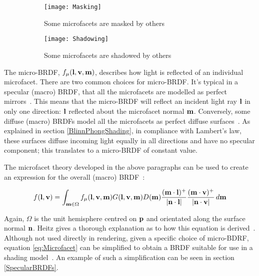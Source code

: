 \begin{figure}[h]
	\begin{subfigure}{0.48\textwidth}
		\texttt{[image: Masking]}
		\caption{Some microfacets are masked by others}
	\end{subfigure}
	\hspace*{\fill}
	\begin{subfigure}{0.48\textwidth}
		\texttt{[image: Shadowing]}
		\caption{Some microfacets are shadowed by others}
	\end{subfigure}
	\caption{}
	\label{fig:MaskingAndShadowing}
\end{figure}

The micro-BRDF, \begin{math}f_\mu(\mathbf{l}, \mathbf{v}, \mathbf{m})\end{math}, describes how light is reflected of an individual microfacet. There are two common choices for micro-BRDF. It's typical in a specular (macro) BRDF, that all the microfacets are modelled as perfect mirrors~\cite{CookTorrance}. This means that the micro-BRDF will reflect an incident light ray \begin{math}\mathbf{l}\end{math} in only one direction: \begin{math}\mathbf{l}\end{math} reflected about the microfacet normal \begin{math}\mathbf{m}\end{math}. Conversely, some diffuse (macro) BRDFs model all the microfacets as perfect diffuse surfaces~\cite{OrenAndNayar}. As explained in section \ref{BlinnPhongShading}, in compliance with Lambert's law, these surfaces diffuse incoming light equally in all directions and have no specular component; this translates to a micro-BRDF of constant value.

The microfacet theory developed in the above paragraphs can be used to create an expression for the overall (macro) BRDF~\cite{RTR4}:

\begin{equation} \label{eq:Microfacet}
	f(\mathbf{l}, \mathbf{v}) = \int_{\mathbf{m}\in\Omega}f_\mu(\mathbf{l}, \mathbf{v}, \mathbf{m})G(\mathbf{l}, \mathbf{v}, \mathbf{m})D(\mathbf{m})\frac{(\mathbf{m}\cdot\mathbf{l})^+}{\abs{\mathbf{n}\cdot\mathbf{l}}}\frac{(\mathbf{m}\cdot\mathbf{v})^+}{\abs{\mathbf{n}\cdot\mathbf{v}}}\,d\mathbf{m}
\end{equation}

Again, \begin{math}\Omega\end{math} is the unit hemisphere centred on \begin{math}\mathbf{p}\end{math} and orientated along the surface normal \begin{math}\mathbf{n}\end{math}. Heitz gives a thorough explanation as to how this equation is derived~\cite{HeitzMicrofacetTheory}. Although not used directly in rendering, given a specific choice of micro-BDRF, equation \ref{eq:Microfacet} can be simplified to obtain a BRDF suitable for use in a shading model~\cite{RTR4}. An example of such a simplification can be seen in section \ref{SpecularBRDFs}.

